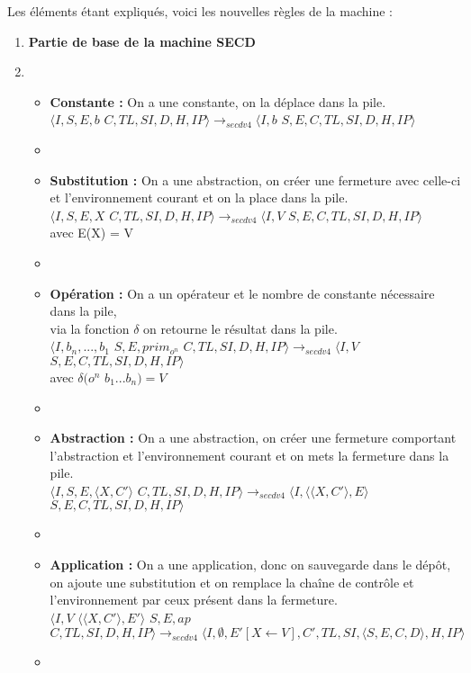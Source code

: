 \documentclass[10pt,a4paper]{article}
\begin{document}
			Les éléments étant expliqués, voici les nouvelles règles de la machine :
			\medbreak
			\begin{enumerate}
				\item[] \textbf{Partie de base de la machine SECD} 
				\item[]
				\begin{itemize}
					\item[] \textbf{Constante :} On a une constante, on la déplace dans la pile.
					\\$\langle I,S,E,b$ $C,TL,SI,D,H,IP\rangle 
					\longrightarrow_{secdv4} \langle I,b$ $S,E,C,TL,SI,D,H,IP\rangle$
					\item[]
					
					\item[] \textbf{Substitution :} On a une abstraction, on créer une fermeture avec celle-ci et l'environnement courant et on la place dans la pile.
					\\$\langle I,S,E,X$ $C,TL,SI,D,H,IP\rangle
					\longrightarrow_{secdv4} \langle I,V$ $S,E,C,TL,SI,D,H,IP\rangle$\\ avec E(X) = V
					\item[]
					
					\item[] \textbf{Opération :} On a un opérateur et le nombre de constante nécessaire dans la pile, \\via la fonction $\delta$ on retourne le résultat dans la pile.
					\\ $\langle I,b_{n},...,b_{1}$ $S,E,prim_{o^{n}}$ $C,TL,SI,D,H,IP\rangle
					\longrightarrow_{secdv4} \langle I,V$ $S,E,C,TL,SI,D,H,IP\rangle$
					\\avec $\delta(o^{n}$ $b_{1}...b_{n}) = V$
					\item[]
					
					\item[]  \textbf{Abstraction :} On a une abstraction, on créer une fermeture comportant l'abstraction et l'environnement courant et on mets la fermeture dans la pile.
					\\$\langle I,S,E,\langle X,C'\rangle$ $C,TL,SI,D,H,IP\rangle
					\longrightarrow_{secdv4} \langle I,\langle\langle X,C'\rangle,E\rangle$ $S,E,C,TL,SI,D,H,IP\rangle$
					\item[]
					
					\item[]  \textbf{Application :} On a une application, donc on sauvegarde dans le dépôt, on ajoute une substitution et on remplace la chaîne de contrôle et l'environnement par ceux présent dans la fermeture.
					\\$\langle I,V$ $\langle\langle X,C'\rangle,E'\rangle$ $S,E,ap$ $C,TL,SI,D,H,IP\rangle
					\longrightarrow_{secdv4} \langle I,\emptyset,E'[X \leftarrow V],C',TL,SI,\langle S,E,C,D\rangle,H,IP\rangle$
					\item[] 
					

\end{itemize}
\end{enumerate}
\end{document}
